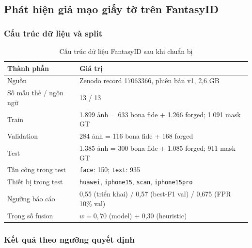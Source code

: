\documentclass[12pt,a4paper]{article}
\begin{document}
\subsection{Phát hiện giả mạo giấy tờ trên FantasyID}
\subsubsection{Cấu trúc dữ liệu và split}
\begin{table}[H]
  \centering
  \caption{Cấu trúc dữ liệu FantasyID sau khi chuẩn bị}
  \label{tab:fantasyid-composition}
  \small
  \begin{tabular}{@{}ll@{}}
    \toprule
    \textbf{Thành phần} & \textbf{Giá trị}\\
    \midrule
    Nguồn & Zenodo record 17063366, phiên bản v1, 2,6 GB\\
    Số mẫu thẻ / ngôn ngữ & 13 / 13\\
    Train & 1.899 ảnh = 633 bona fide + 1.266 forged; 1.091 mask GT\\
    Validation & 284 ảnh = 116 bona fide + 168 forged\\
    Test & 1.385 ảnh = 300 bona fide + 1.085 forged; 911 mask GT\\
    Tấn công trong test & \texttt{face}: 150; \texttt{text}: 935\\
    Thiết bị trong test & \texttt{huawei}, \texttt{iphone15}, \texttt{scan}, \texttt{iphone15pro}\\
    Ngưỡng báo cáo & 0,55 (triển khai) / 0,57 (best-F1 val) / 0,675 (FPR 10\% val)\\
    Trọng số fusion & $w=0{,}70$ (model) + 0,30 (heuristic)\\
    \bottomrule
  \end{tabular}
\end{table}

\subsubsection{Kết quả theo ngưỡng quyết định}
\begin{table}[H]
  \centering
  \caption{Kết quả TamperNet + heuristic trên tập test FantasyID tại ba ngưỡng}
  \label{tab:tamper-fantasyid}
  \footnotesize
\end{table}
\end{document}
